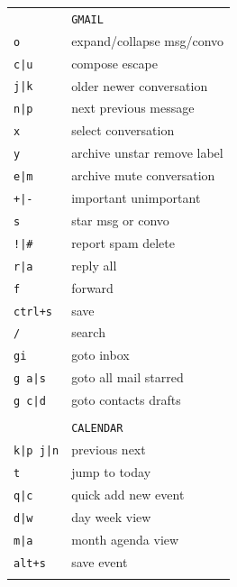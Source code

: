 \documentclass[a4paper,12pt]{article}
\begin{document}
\begin{multicols}{2}
\bigskip

\begin{tabular}{ll}
&\texttt{GMAIL}\\
\texttt{o}&expand/collapse msg/convo\\
\texttt{c|u}&compose \textbar{} escape\\
\texttt{j|k}&older \textbar{} newer conversation\\
\texttt{n|p}&next \textbar{} previous message\\
\texttt{x}&select conversation\\
\texttt{y}&archive \textbar{} unstar \textbar{} remove label\\
\texttt{e|m}&archive \textbar{} mute conversation\\
\texttt{+|-}&important \textbar{} unimportant\\
\texttt{s}&star msg or convo\\ 
\texttt{!|\#}&report spam \textbar{} delete\\ 
\texttt{r|a}&reply \textbar{} all\\ 
\texttt{f}&forward\\ 
\texttt{ctrl+s}&save\\
\texttt{/}&search\\ 
\texttt{gi}&goto inbox\\
\texttt{g a|s}&goto all mail \textbar{} starred\\ 
\texttt{g c|d}&goto contacts \textbar{} drafts\\ 
&\\
&\texttt{CALENDAR}\\
\texttt{k|p j|n}&previous next\\
\texttt{t}&jump to today\\
\texttt{q|c}&quick add \textbar{} new event\\
\texttt{d|w}&day \textbar{} week view\\
\texttt{m|a}&month \textbar{} agenda view\\
\texttt{alt+s}&save event\\
\\

\end{tabular}
\end{multicols}
\end{document}
